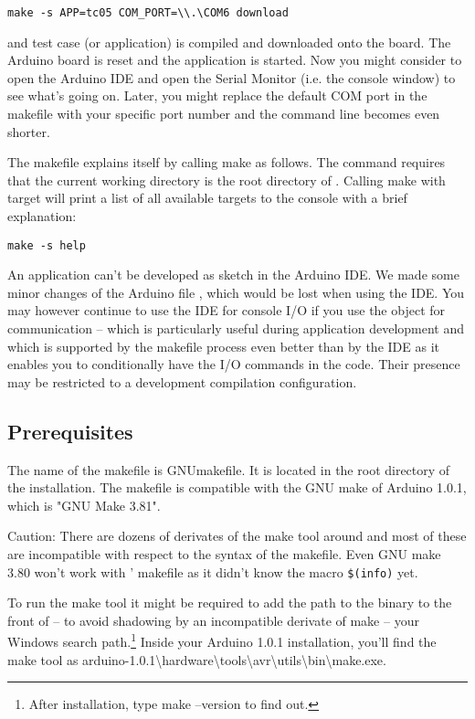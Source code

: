\verb+make -s APP=tc05 COM_PORT=\\.\COM6 download+

and test case (or application)  is compiled and downloaded
onto the board. The Arduino board is reset and the \rtos{} application is
started. Now you might consider to open the Arduino IDE and open the
Serial Monitor (i.e. the console window) to see what's going on. Later,
you might replace the default COM port in the makefile with your specific
port number and the command line becomes even shorter.

The makefile explains itself by calling make as follows. The command
requires that the current working directory is the root directory of
\rtos{}. Calling make with target  will print a list of all
available targets to the console with a brief explanation:

\verb+make -s help+

An \rtos{} application can't be developed as sketch in the Arduino IDE. We
made some minor changes of the Arduino file , which would be
lost when using the IDE. You may however continue to use the IDE for
console I/O if you use the object  for communication --
which is particularly useful during application development and which is
supported by the makefile process even better than by the IDE as it
enables you to conditionally have the I/O commands in the code. Their
presence may be restricted to a development compilation configuration.


\subsection{Prerequisites}

The name of the makefile is GNUmakefile. It is located in the root
directory of the \rtos{} installation. The makefile is compatible with the
GNU make of Arduino 1.0.1, which is "GNU Make 3.81".

Caution: There are dozens of derivates of the make tool around and most
of these are incompatible with respect to the syntax of the makefile. Even
GNU make 3.80 won't work with \rtos' makefile as it didn't know the
macro \verb+$(info)+ yet.

To run the make tool it might be required to add the path to the binary to
the front of -- to avoid shadowing by an incompatible derivate of make --
your Windows search path.\footnote{After installation, type make --version
to find out.} Inside your Arduino 1.0.1 installation, you'll find the make
tool as
arduino-1.0.1\textbackslash\-hard\-ware\textbackslash\-tools\textbackslash\-avr\textbackslash\-utils\textbackslash\-bin\textbackslash\-make.exe.

